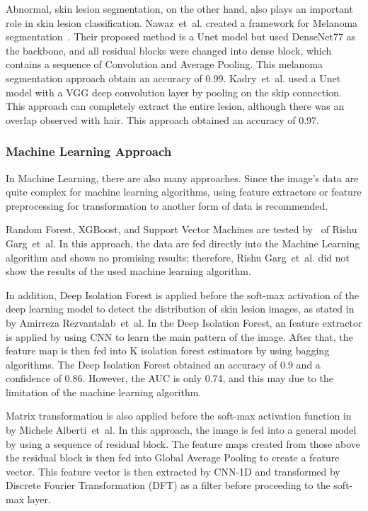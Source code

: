 \documentclass[sensors,article,accept,pdftex,moreauthors]{Definitions/mdpi}
\begin{document}
{		Abnormal, skin lesion segmentation, on the other hand, also plays an important role in skin lesion classification. Nawaz~et~al. created a framework for Melanoma segmentation~\mbox{\cite{22750}}. Their proposed method is a Unet model but used  DenseNet77 as the  backbone, and all residual blocks were changed into dense block, which contains a sequence of Convolution and  Average Pooling. This melanoma segmentation approach obtain an accuracy of 0.99. Kadry~et~al. used a Unet model with a VGG deep convolution layer by pooling on the skip connection. This approach can completely extract the entire lesion, although there was an overlap observed with hair. This approach obtained an  accuracy of 0.97.
		
		\subsubsection{Machine Learning Approach}
		In Machine Learning, there are also many approaches. Since the image's data are quite complex for machine learning algorithms,  using feature extractors or feature preprocessing for transformation to another form of data is recommended.
		
		Random Forest, XGBoost, and Support Vector Machines are tested by~\mbox{\cite{03798}} of Rishu Garg~et~al. In this approach, the data are fed directly into the Machine Learning algorithm and shows no promising results; therefore, Rishu Garg~et~al. did not show the results of the used machine learning algorithm.
		
		In addition, Deep Isolation Forest is applied before the soft-max activation of the deep learning model to detect the  distribution of skin lesion images, as stated in~\mbox{\cite{09365}} by Amirreza Rezvantalab~et~al. In the Deep Isolation Forest, an feature extractor is applied by using CNN to learn the main pattern of the image. After that, the feature map is then fed into K isolation forest estimators by using bagging algorithms. The Deep Isolation Forest obtained  an accuracy of 0.9 and a confidence of 0.86. However, the AUC is only 0.74, and this may due to the limitation of the machine learning algorithm. 
		
		Matrix transformation is also applied before the soft-max activation function in~\mbox{\cite{05045}} by Michele Alberti~et~al. In this approach, the image is fed into a general model by using a sequence of residual block. The feature maps created from those above the residual block is then fed into  Global Average Pooling to create a feature vector. This feature vector is then extracted by CNN-1D and transformed by Discrete Fourier Transformation (DFT) as a filter before proceeding to the soft-max layer. 
	}
	
\end{document}
